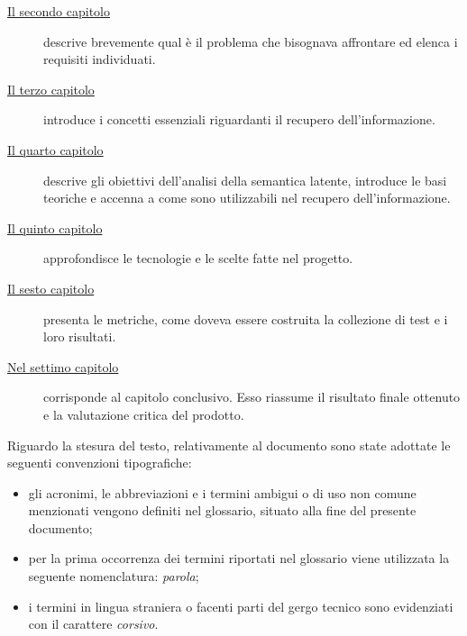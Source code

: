 \begin{description}
    \item[{\hyperref[cap:analisi-requisiti]{Il secondo capitolo}}] descrive brevemente qual è il problema che bisognava affrontare ed elenca i requisiti individuati.
    
    \item[{\hyperref[cap:recupero-informazione]{Il terzo capitolo}}] introduce i concetti essenziali riguardanti il recupero dell'informazione.
    
    \item[{\hyperref[cap:latent-semantic-indexing]{Il quarto capitolo}}] descrive gli obiettivi dell'analisi della semantica latente, introduce le basi teoriche e accenna a come sono utilizzabili nel recupero dell'informazione.
    
    \item[{\hyperref[cap:progettazione-sviluppo]{Il quinto capitolo}}] approfondisce le tecnologie e le scelte fatte nel progetto.
    
    \item[{\hyperref[cap:testing]{Il sesto capitolo}}] presenta le metriche, come doveva essere costruita la collezione di test e i loro risultati. 
    
    \item[{\hyperref[cap:conclusioni]{Nel settimo capitolo}}] corrisponde al capitolo conclusivo. Esso riassume il risultato finale ottenuto e la valutazione critica del prodotto.
\end{description}

Riguardo la stesura del testo, relativamente al documento sono state adottate le seguenti convenzioni tipografiche:
\begin{itemize}
	\item gli acronimi, le abbreviazioni e i termini ambigui o di uso non comune menzionati vengono definiti nel glossario, situato alla fine del presente documento;
	\item per la prima occorrenza dei termini riportati nel glossario viene utilizzata la seguente nomenclatura: \emph{parola}\glsfirstoccur;
	\item i termini in lingua straniera o facenti parti del gergo tecnico sono evidenziati con il carattere \emph{corsivo}.
\end{itemize}